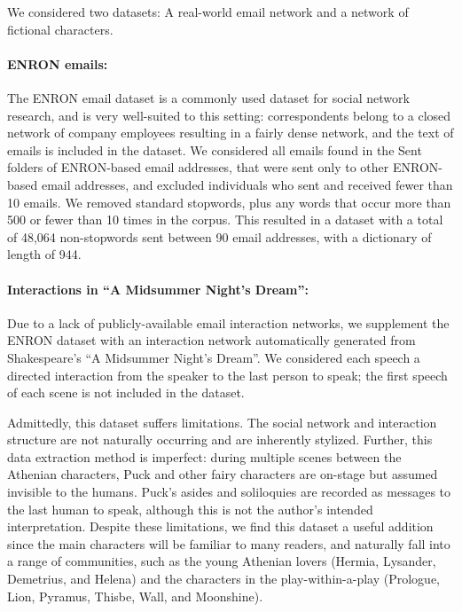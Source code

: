         We considered two datasets: A real-world email network and a network of fictional characters.
        
        \paragraph{ENRON emails:}
            The ENRON email dataset \citep{enron_paper} is a commonly used dataset for social network research, and is very well-suited to this setting: correspondents belong to a closed network of company employees resulting in a fairly dense network, and the text of emails is included in the dataset.  We considered all emails found in the Sent folders of ENRON-based email addresses, that were sent only to other ENRON-based email addresses, and excluded individuals who sent and received fewer than 10 emails. We removed standard stopwords, plus any words that occur more than 500 or fewer than 10 times in the corpus.  This resulted in a dataset with  a total of 48,064 non-stopwords sent between 90 email addresses, with a dictionary of length of 944.
    
        \paragraph{Interactions in ``A Midsummer Night's Dream'':} 
            Due to a lack of publicly-available email interaction networks, we supplement the ENRON dataset with an interaction network automatically generated from Shakespeare's ``A Midsummer Night's Dream''. We considered each speech a directed interaction from the speaker to the last person to speak; the first speech of each scene is not included in the dataset.
            
            Admittedly, this dataset suffers limitations. The social network and interaction structure are not naturally occurring and are inherently stylized. Further, this data extraction method is imperfect: during multiple scenes between the Athenian characters, Puck and other fairy characters are on-stage but assumed invisible to the humans. Puck's asides and soliloquies are recorded as messages to the last human to speak, although this is not the author's intended interpretation. Despite these limitations, we find this dataset a useful addition since the main characters will be familiar to many readers, and naturally fall into a range of communities, such as the young Athenian lovers (Hermia, Lysander, Demetrius, and Helena) and the characters  in the play-within-a-play (Prologue, Lion, Pyramus, Thisbe, Wall, and Moonshine).
            
